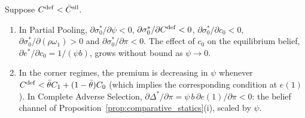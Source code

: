 \label{prop:att_cs}
Suppose $C^{\rm def}<\bar C^{\rm sil}$.
\begin{enumerate}[label=(\roman*)]
    \item In Partial Pooling, $\partial\sigma_0^*/\partial\psi<0$, $\partial\sigma_0^*/\partial C^{\rm def}<0$, $\partial\sigma_0^*/\partial c_0<0$, $\partial\sigma_0^*/\partial(\rho\omega_1)>0$ and $\partial\sigma_0^*/\partial\pi<0$. The effect of $c_0$ on the equilibrium belief, $\partial e^*/\partial c_0=1/(\psi b)$, grows without bound as $\psi\to0$.
    \item In the corner regimes, the premium is decreasing in $\psi$ whenever $C^{\rm def}<\bar\theta C_1+(1-\bar\theta)C_0$ (which implies the corresponding condition at $e(1)$). In Complete Adverse Selection, $\partial\Delta^*/\partial\pi=\psi\,b\,\partial e(1)/\partial\pi<0$: the belief channel of Proposition~\ref{prop:comparative_statics}(i), scaled by $\psi$.
\end{enumerate}
